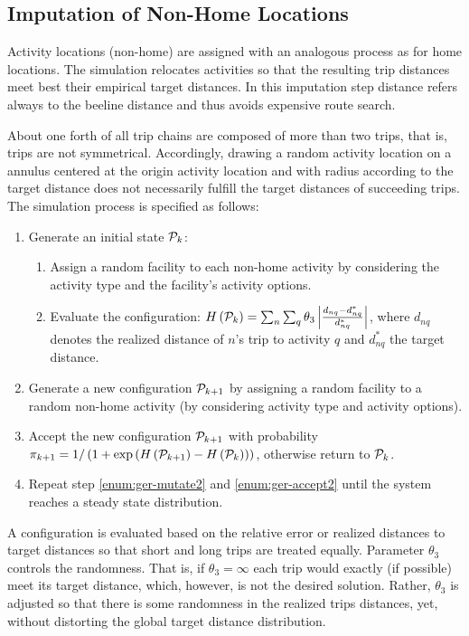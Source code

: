 \subsection{Imputation of Non-Home Locations}
\label{ch:germany:imputation2}
Activity locations (non-home) are assigned with an analogous process as for home locations. The simulation relocates activities so that the resulting trip distances meet best their empirical target distances. In this imputation step distance refers always to the beeline distance and thus avoids expensive route search. 

About one forth of all trip chains are composed of more than two trips, that is, trips are not symmetrical. Accordingly, drawing a random activity location on a annulus centered at the origin activity location and with radius according to the target distance does not necessarily fulfill the target distances of succeeding trips. The simulation process is specified as follows:

\begin{enumerate}
\item Generate an initial state ${\cal P}_k$:
\begin{enumerate}
\item Assign a random facility to each non-home activity by considering the activity type and the facility's activity options.
\item Evaluate the configuration: $H\left( {\cal P}_k \right)=\sum_n \sum_q \theta_3 \left| \frac{d_{nq} - d_{nq}^*}{d_{nq}^*}\right|$, where $d_{nq}$ denotes the realized distance of $n$'s trip to activity $q$ and $d_{nq}^*$ the target distance.
\end{enumerate}
\item \label{enum:ger-mutate2} Generate a new configuration ${\cal P}_{k+1}$ by assigning a random facility to a random non-home activity (by considering activity type and activity options).
\item \label{enum:ger-accept2} Accept the new configuration ${\cal P}_{k+1}$ with probability $\pi_{k+1} = 1 / \left( 1 + \exp \left(  H\left( {\cal P}_{k+1} \right) - H \left( {\cal P}_{k} \right) \right)\right)$, otherwise return to ${\cal P}_{k}$.

\item Repeat step \ref{enum:ger-mutate2} and \ref{enum:ger-accept2} until the system reaches a steady state distribution.
\end{enumerate}

A configuration is evaluated based on the relative error or realized distances to target distances so that short and long trips are treated equally. Parameter $\theta_3$ controls the randomness. That is, if $\theta_3 = \infty$ each trip would exactly (if possible) meet its target distance, which, however, is not the desired solution. Rather, $\theta_3$ is adjusted so that there is some randomness in the realized trips distances, yet, without distorting the global target distance distribution.

